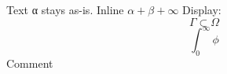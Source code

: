 \documentclass{article}
\begin{document}
Text α stays as-is.
Inline $ \alpha  + \beta  + \infty  $
Display:
\[
\Gamma  \subset  \Omega 
\]
\begin{equation}
\int _0^\infty  \phi 
\end{equation}
Comment %
\end{document}
